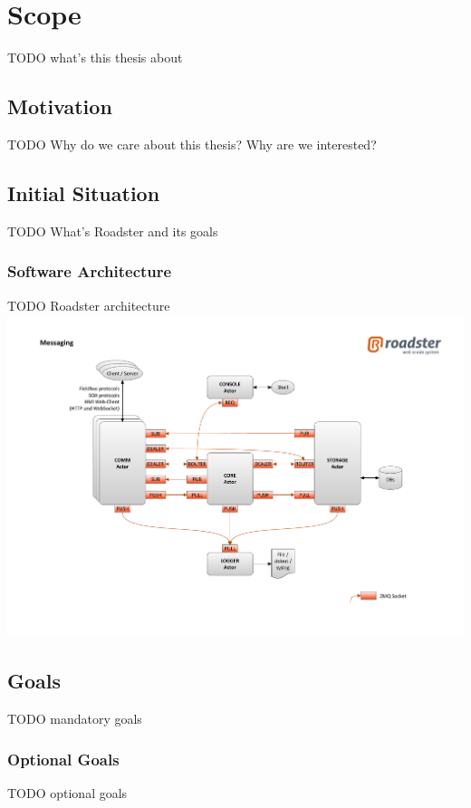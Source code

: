 \chapter{Scope}
TODO what's this thesis about

\section{Motivation}
TODO Why do we care about this thesis? Why are we interested?

\section{Initial Situation}
TODO What's Roadster and its goals

\subsection{Software Architecture}
TODO Roadster architecture\\

\includegraphics[trim=4cm 2cm 3.5cm 2.8cm, clip=true, width=\textwidth]{img/roadster_arch.pdf}

\section{Goals}
TODO mandatory goals

\subsection*{Optional Goals}
TODO optional goals
